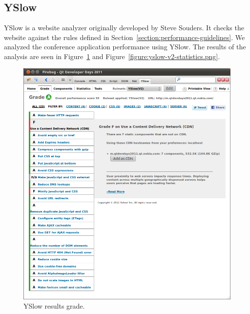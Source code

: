 \subsection{YSlow}

YSlow is a website analyzer originally developed by Steve Souders. It
checks the website against the rules defined in
Section~\ref{section:performance-guidelines}. We analyzed the
conference application performance using YSlow. The results of the
analysis are seen in Figure~\ref{figure:yslow-v2-grade.png} and
Figure~\ref{figure:yslow-v2-statistics.png}.

\begin{figure}[ht]
  \begin{center}
    \includegraphics[width=\textwidth]{images/yslow-v2-grade.png}
    \caption{YSlow results grade.}
    \label{figure:yslow-v2-grade.png}
  \end{center}
\end{figure}

